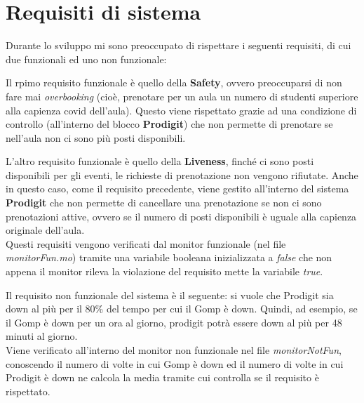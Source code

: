 \chapter*{Requisiti di sistema}
Durante lo sviluppo mi sono preoccupato di rispettare i seguenti requisiti, di cui due funzionali ed uno non funzionale:
\par Il rpimo requisito funzionale è quello della \textbf{Safety}, ovvero preoccuparsi di non fare mai \textit{overbooking} (cioè, prenotare per un aula un numero di studenti superiore alla capienza covid dell’aula). Questo viene rispettato grazie ad una condizione di controllo (all’interno del blocco \textbf{Prodigit}) che non permette di prenotare se nell’aula non ci sono più posti disponibili.
\par L’altro requisito funzionale è quello della \textbf{Liveness}, finché ci sono posti disponibili per gli eventi, le richieste di prenotazione non vengono rifiutate. Anche in questo caso, come il requisito precedente, viene gestito all’interno del sistema \textbf{Prodigit} che  non permette di cancellare una prenotazione se non ci sono prenotazioni attive, ovvero se il numero di posti disponibili è uguale alla capienza originale dell’aula.\\
 Questi requisiti vengono verificati dal monitor funzionale (nel file \textit{monitorFun.mo})  tramite una variabile booleana inizializzata a \textit{false} che  non appena il monitor rileva la violazione del requisito mette la variabile \textit{true}.\newline

\par Il requisito non funzionale del sistema è il seguente: si vuole che Prodigit sia down al più per il 80\% del tempo per cui il Gomp è down. Quindi, ad esempio, se il Gomp è down per un ora al giorno, prodigit potrà essere down al più per 48 minuti al giorno.\\ 
Viene verificato all’interno del monitor non funzionale nel file \textit{monitorNotFun}, conoscendo il numero di volte in cui Gomp è down ed il numero di volte in cui Prodigit è down ne calcola la media tramite cui controlla se il requisito è rispettato.
 